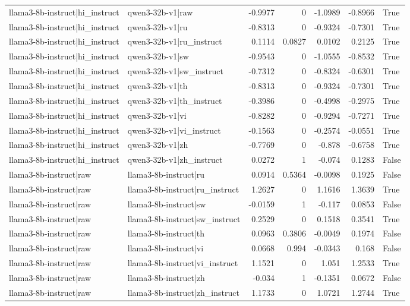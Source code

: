\begin{table}
\begin{tabular}{l l r r r r l}
llama3-8b-instruct|hi_instruct & qwen3-32b-v1|raw & -0.9977 & 0 & -1.0989 & -0.8966 & True \\
llama3-8b-instruct|hi_instruct & qwen3-32b-v1|ru & -0.8313 & 0 & -0.9324 & -0.7301 & True \\
llama3-8b-instruct|hi_instruct & qwen3-32b-v1|ru_instruct & 0.1114 & 0.0827 & 0.0102 & 0.2125 & True \\
llama3-8b-instruct|hi_instruct & qwen3-32b-v1|sw & -0.9543 & 0 & -1.0555 & -0.8532 & True \\
llama3-8b-instruct|hi_instruct & qwen3-32b-v1|sw_instruct & -0.7312 & 0 & -0.8324 & -0.6301 & True \\
llama3-8b-instruct|hi_instruct & qwen3-32b-v1|th & -0.8313 & 0 & -0.9324 & -0.7301 & True \\
llama3-8b-instruct|hi_instruct & qwen3-32b-v1|th_instruct & -0.3986 & 0 & -0.4998 & -0.2975 & True \\
llama3-8b-instruct|hi_instruct & qwen3-32b-v1|vi & -0.8282 & 0 & -0.9294 & -0.7271 & True \\
llama3-8b-instruct|hi_instruct & qwen3-32b-v1|vi_instruct & -0.1563 & 0 & -0.2574 & -0.0551 & True \\
llama3-8b-instruct|hi_instruct & qwen3-32b-v1|zh & -0.7769 & 0 & -0.878 & -0.6758 & True \\
llama3-8b-instruct|hi_instruct & qwen3-32b-v1|zh_instruct & 0.0272 & 1 & -0.074 & 0.1283 & False \\
llama3-8b-instruct|raw & llama3-8b-instruct|ru & 0.0914 & 0.5364 & -0.0098 & 0.1925 & False \\
llama3-8b-instruct|raw & llama3-8b-instruct|ru_instruct & 1.2627 & 0 & 1.1616 & 1.3639 & True \\
llama3-8b-instruct|raw & llama3-8b-instruct|sw & -0.0159 & 1 & -0.117 & 0.0853 & False \\
llama3-8b-instruct|raw & llama3-8b-instruct|sw_instruct & 0.2529 & 0 & 0.1518 & 0.3541 & True \\
llama3-8b-instruct|raw & llama3-8b-instruct|th & 0.0963 & 0.3806 & -0.0049 & 0.1974 & False \\
llama3-8b-instruct|raw & llama3-8b-instruct|vi & 0.0668 & 0.994 & -0.0343 & 0.168 & False \\
llama3-8b-instruct|raw & llama3-8b-instruct|vi_instruct & 1.1521 & 0 & 1.051 & 1.2533 & True \\
llama3-8b-instruct|raw & llama3-8b-instruct|zh & -0.034 & 1 & -0.1351 & 0.0672 & False \\
llama3-8b-instruct|raw & llama3-8b-instruct|zh_instruct & 1.1733 & 0 & 1.0721 & 1.2744 & True \\

\end{tabular}
\end{table}
